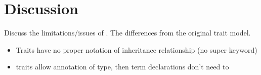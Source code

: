 
\section{Discussion}
\label{sec:discuss}

Discuss the limitations/issues of \name. The differences from the original trait model.



\begin{itemize}
\item Traits have no proper notation of inheritance relationship (no super keyword)
\item traits allow annotation of type, then term declarations don't need to
\end{itemize}